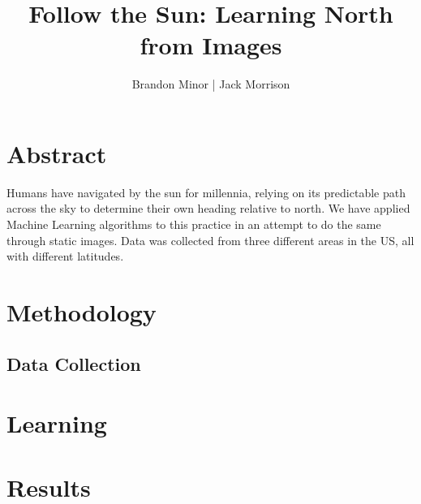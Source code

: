 \documentclass{article}
\begin{document}
\title{Follow the Sun: Learning North from Images}
\author{Brandon Minor | Jack Morrison}
\maketitle

\section{Abstract}

Humans have navigated by the sun for millennia, relying on its predictable path across the sky to determine their own heading relative to north. We have applied Machine Learning algorithms to this practice in an attempt to do the same through static images. Data was collected from three different areas in the US, all with different latitudes. 

\section{Methodology}

\subsection{Data Collection}






\section{Learning}






\section{Results}
\end{document}
